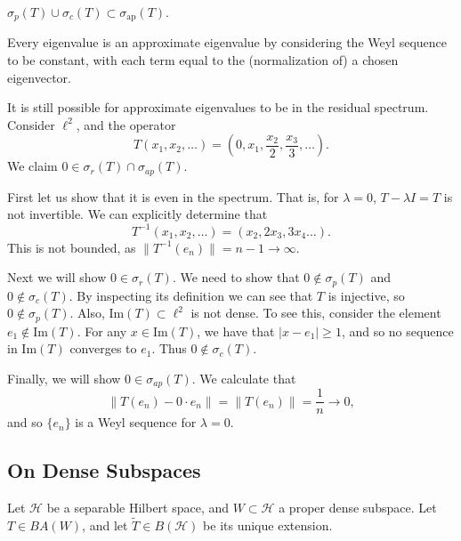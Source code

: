 \documentclass[12pt]{article}
\begin{document}
\begin{corollary}
	$\sigma_p(T) \cup \sigma_c(T) \subset \sigma_{\text{ap}}(T)$.
\end{corollary}

\begin{remark}
\label{rmk_eigenvalues_are_approximate}
	Every eigenvalue is an approximate eigenvalue by considering the Weyl sequence to be constant, with each term equal to the (normalization of) a chosen eigenvector.
\end{remark}

\begin{remark}
	It is still possible for approximate eigenvalues to be in the residual spectrum. Consider $\ell^2$, and the operator
\begin{equation*}
	T(x_1,x_2,\dots)=(0,x_1,\frac{x_2}{2},\frac{x_3}{3},\dots).
\end{equation*}
We claim $0\in\sigma_r(T)\cap\sigma_{ap}(T)$. 

	First let us show that it is even in the spectrum. That is, for $\lambda=0$, $T-\lambda I=T$ is not invertible. We can explicitly determine that
\begin{equation*}
	T^{-1}(x_1,x_2,\dots) = (x_2, 2x_3, 3x_4 \dots).
\end{equation*}
This is not bounded, as $\|T^{-1}(e_n)\| = n-1 \to \infty$.

	Next we will show $0\in\sigma_r(T)$. We need to show that $0\not\in\sigma_p(T)$ and $0\not\in\sigma_c(T)$. By inspecting its definition we can see that $T$ is injective, so $0\not\in\sigma_p(T)$. Also, $\text{Im}(T)\subset\ell^2$ is not dense. To see this, consider the element $e_1\not\in\text{Im}(T)$. For any $x\in\text{Im}(T)$, we have that $|x-e_1|\geq 1$, and so no sequence in $\text{Im}(T)$ converges to $e_1$. Thus $0\not\in\sigma_c(T)$. 

	Finally, we will show $0\in\sigma_{ap}(T)$. We calculate that 
	\begin{equation*}
		\|T(e_n) - 0\cdot e_n\| = \|T(e_n)\| = \frac{1}{n}\to 0,
	\end{equation*}
	and so $\{e_n\}$ is a Weyl sequence for $\lambda=0$.
\end{remark}


\subsection{On Dense Subspaces} %

Let $\mathcal{H}$ be a separable Hilbert space, and $W\subset\mathcal{H}$ a proper dense subspace. Let $T\in BA(W)$, and let $\tilde{T}\in B(\mathcal{H})$ be its unique extension.
\end{document}
